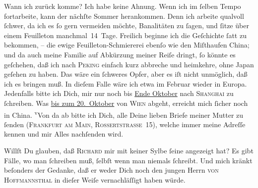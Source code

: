 \pstart
           {\pb}Wann ich zurück komme? Ich habe keine Ahnung. Wenn
               ich im ſelben Tempo fortarbeite, kann der nächſte Sommer herankommen. Denn ich
               arbeite qualvoll ſchwer, da ich es ſo gern vermeiden möchte, Banalitäten zu ſagen,
               und ſitze über einem Feuilleton manchmal 14 Tage. Freilich beginne ich die Geſchichte
               ſatt zu bekommen, – die ewige Feuilleton-Schmiererei ebenſo wie den Miſthaufen China; und da  auch meine Familie auf Abkürzung meiner Reiſe {\pb}dringt, ſo könnte es geſchehen, daß ich nach \textsc{Peking} einfach kurz abbreche und heimkehre, ohne Japan geſehen zu haben. Das wäre ein ſchweres Opfer, aber es iſt nicht
               unmöglich, daß ich es bringen muß. In dieſem Falle wäre ich etwa im Februar wieder in Europa. Jedenfalls bitte ich Dich, mir nur noch bis \uline{Ende Oktober} nach \textsc{Shanghai} zu ſchreiben. Was \uline{bis zum 20. Oktober} von \textsc{Wien} abgeht, erreicht mich ſicher noch in China. {\pb}\substVorne{}\textsuperscript{v}\substDazwischen{}V\substHinten{}on da ab bitte ich Dich, alle Deine 
               lieben Briefe meiner Mutter
               zu ſenden (\textsc{Frankfurt am Main,  Rossertstraſse 15}), welche  immer meine
               Adreſſe kennen und mir Alles nachſenden wird.\pend
           
\pstart
           Willſt Du glauben, daß \textsc{Richard} mir mit keiner Sylbe ſeine \label{K_L02854-7v}\label{K_L02854-7} angezeigt hat? Es gibt Fälle, wo man ſchreiben muß, ſelbſt wenn man niemals
               ſchreibt. Und mich kränkt {\pb}beſonders der Gedanke,
               daß er weder Dich noch den jungen Herrn \textsc{von Hoffmannsthal} in dieſer Weiſe vernachläſſigt haben würde. \label{K_L02854-8v}\label{K_L02854-8}\pend
           
